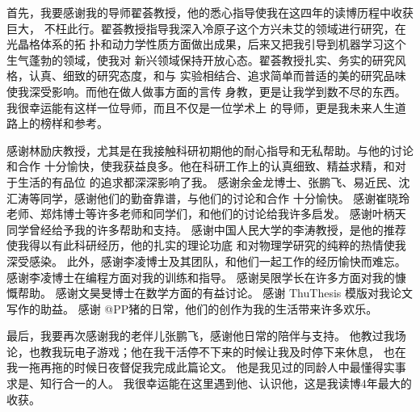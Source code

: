 \begin{acknowledgement}

首先，我要感谢我的导师翟荟教授，他的悉心指导使我在这四年的读博历程中收获巨大，
不枉此行。翟荟教授指导我深入冷原子这个方兴未艾的领域进行研究，在光晶格体系的拓
扑和动力学性质方面做出成果，后来又把我引导到机器学习这个生气蓬勃的领域，使我对
新兴领域保持开放心态。翟荟教授扎实、务实的研究风格，认真、细致的研究态度，和与
实验相结合、追求简单而普适的美的研究品味使我深受影响。而他在做人做事方面的言传
身教，更是让我学到数不尽的东西。我很幸运能有这样一位导师，而且不仅是一位学术上
的导师，更是我未来人生道路上的榜样和参考。

感谢林励庆教授，尤其是在我接触科研初期他的耐心指导和无私帮助。与他的讨论和合作
十分愉快，使我获益良多。他在科研工作上的认真细致、精益求精，和对于生活的有品位
的追求都深深影响了我。
感谢余金龙博士、张鹏飞、易近民、沈汇涛等同学，感谢他们的勤奋靠谱，与他们的讨论和合作
十分愉快。
感谢崔晓玲老师、郑炜博士等许多老师和同学们，和他们的讨论给我许多启发。
感谢叶柄天同学曾经给予我的许多帮助和支持。
感谢中国人民大学的李涛教授，是他的推荐使我得以有此科研经历，他的扎实的理论功底
和对物理学研究的纯粹的热情使我深受感染。
此外，感谢李凌博士及其团队，和他们一起工作的经历愉快而难忘。
感谢李凌博士在编程方面对我的训练和指导。
感谢吴限学长在许多方面对我的慷慨帮助。
感谢文昊旻博士在数学方面的有益讨论。
感谢 ThuThesis 模版对我论文写作的助益。
感谢 @PP猪的日常，他们的创作为我的生活带来许多欢乐。

最后，我要再次感谢我的老伴儿张鹏飞，感谢他日常的陪伴与支持。
他教过我场论，也教我玩电子游戏；他在我干活停不下来的时候让我及时停下来休息，
也在我一拖再拖的时候日夜督促我完成此篇论文。
他是我见过的同龄人中最懂得实事求是、知行合一的人。
我很幸运能在这里遇到他、认识他，这是我读博4年最大的收获。


\end{acknowledgement}
